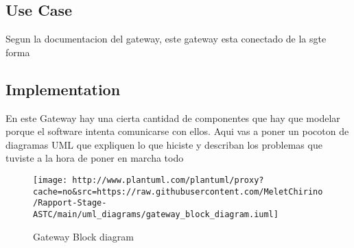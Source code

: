 \subsection{Use Case}
Segun la documentacion del gateway, este gateway esta conectado de la sgte forma
\subsection{Implementation}
En este Gateway hay una cierta cantidad de componentes que hay que modelar porque el software intenta comunicarse con ellos.
Aqui vas a poner un pocoton de diagramas UML que expliquen lo que hiciste y describan los problemas que tuviste a la hora de poner en marcha todo

\begin{figure}[!htb]
 \centering
 \texttt{[image: http://www.plantuml.com/plantuml/proxy?cache=no\&src=https://raw.githubusercontent.com/MeletChirino/Rapport-Stage-ASTC/main/uml\_diagrams/gateway\_block\_diagram.iuml]}
 \caption{Gateway Block diagram}
 \label{fig:block diagram}
\end{figure}